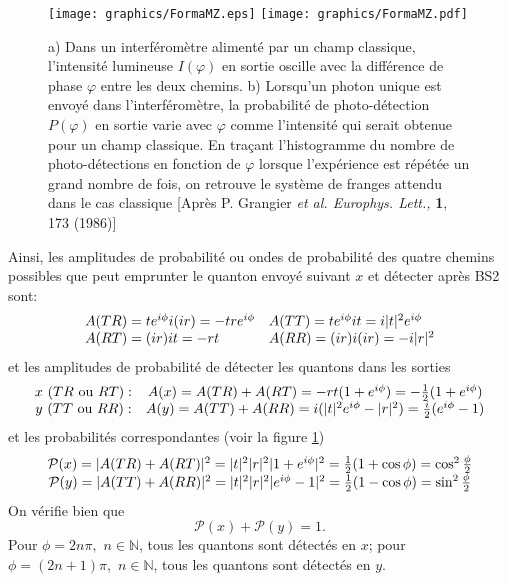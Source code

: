 \begin{figure}[tbh]
\centering
\ifcase\msipdfoutput
	\texttt{[image: graphics/FormaMZ.eps]}
\else
	\texttt{[image: graphics/FormaMZ.pdf]}
\fi
\caption{a) Dans un interféromètre alimenté par un champ classique,
l'intensité lumineuse $I(\varphi)$ en sortie oscille avec la différence de
phase $\varphi$ entre les deux chemins. b) Lorsqu'un photon unique est envoyé
dans l'interféromètre, la probabilité de photo-détection $P(\varphi)$ en
sortie varie avec $\varphi$ comme l'intensité qui serait obtenue pour un champ
classique. En traçant l'histogramme du nombre de photo-détections en fonction
de $\varphi$ lorsque l'expérience est répétée un grand nombre de fois, on
retrouve le système de franges attendu dans le cas classique [Après P.
Grangier \emph{et al. Europhys. Lett.,} \textbf{1}, 173 (1986)]}%
\label{fig:FormaMZ}%
\end{figure}

Ainsi, les amplitudes de probabilité ou ondes de probabilité des quatre
chemins possibles que peut emprunter le quanton envoyé suivant $x$ et détecter
après BS2 sont:%
\begin{equation}%
\begin{array}
[c]{ll}%
A(TR)=te^{i\phi}i(ir)=-tre^{i\phi} &
A(TT)=te^{i\phi}it=i|t|^{2}e^{i\phi} \\
A(RT)=(ir)it=-rt & A(RR)=(ir)i(ir)=-i|r|^{2}%
\end{array}
\label{eq:FactoAmpl1}%
\end{equation}
et les amplitudes de probabilité de détecter les quantons dans les sorties%
\begin{equation}%
\begin{array}
[c]{cc}%
x\ (TR\text{ ou }RT): & A(x)=A(TR)+A(RT)=-rt(1+e^{i\phi})=-\frac{1}%
{2}(1+e^{i\phi})\\
y\ (TT\text{ ou }RR): & A(y)=A(TT)+A(RR)=i(|t|^{2}e^{i\phi}-|r|^{2})
=\frac{i}{2}(e^{i\phi}-1)
\end{array}
\end{equation}
et les probabilités correspondantes (voir la figure \ref{fig:FormaMZ})%
\begin{equation}%
\begin{array}
[c]{c}%
\mathcal{P}(x)=|A(TR)+A(RT)|^{2}=|t|^{2}|r|^{2}|1+e^{i\phi}|^{2}%
=\frac{1}{2}(1+\cos\phi)=\cos^{2}\frac{\phi}{2}\\
\mathcal{P}(y)=|A(TT)+A(RR)|^{2}=|t|^{2}|r|^{2}|e^{i\phi}-1|^{2}%
=\frac{1}{2}(1-\cos\phi)=\sin^{2}\frac{\phi}{2}%
\end{array}
\end{equation}
On vérifie bien que
\begin{equation}
\mathcal{P}(x)+\mathcal{P}(y)=1.
\label{eq:RelCompl1}%
\end{equation}
Pour $\phi=2n\pi,$ $n\in\mathbb{N}$, tous les quantons sont détectés en $x$;
pour $\phi=(2n+1)\pi,$ $n\in\mathbb{N}$, tous les quantons sont détectés en
$y$.

